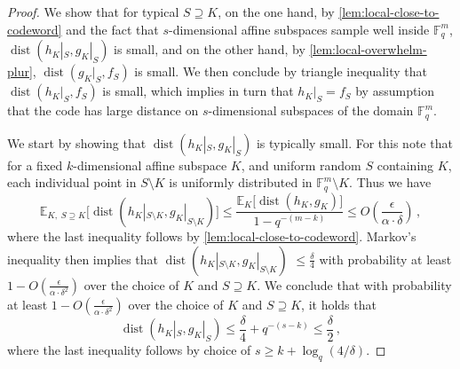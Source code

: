 \documentclass{toc}
\theoremstyle{plain}
\DeclareMathOperator{\dist}{dist} %
\newcommand{\E}{{\mathbb{E}}}
\newcommand{\F}{{\mathbb{F}}}
\begin{document}
\begin{proof}
  We show that for typical $S \supseteq K$, on the one hand, by \cref{lem:local-close-to-codeword} and the fact that $s$-dimensional affine subspaces sample well inside $\F_q^m$, $\dist(h_K|_S, g_K|_S)$ is small, and on the other hand, by \cref{lem:local-overwhelm-plur}, $\dist(g_K|_S, f_S)$ is small. We then conclude by triangle inequality that $\dist(h_K|_S, f_S)$ is  small, which implies in turn that $h_K|_S = f_S$ by assumption that the code
has large distance  %
on $s$-dimensional subspaces
of the domain $\F_q^m$.   %
%

We start by showing that $\dist(h_K|_S, g_K|_S)$ is typically small.
For this note that for a fixed $k$-dimensional affine subspace $K$, and uniform random $S$ containing $K$, each individual point in $S \setminus K$ is uniformly distributed in $\F_q^m\setminus K$. Thus we have
\[
 \E_{K,\;S \supseteq K}\big[\dist(h_{K}|_{S\setminus K},g_{K}|_{S \setminus K})\big] \leq \frac{\mathbb{E}_{K}\big[\dist(h_K,g_K)\big] } {1- q^{-(m-k)}}\leq O\left(\frac{\epsilon} {\alpha \cdot \delta}\right)\,,
\]
 where the last inequality follows by \cref{lem:local-close-to-codeword}. Markov's inequality then implies that 
 $\dist(h_{K}|_{S\setminus K},g_{K}|_{S \setminus K})$
%
$ \leq \frac{\delta} {4}$ with probability at least $1- O\left(\frac{\epsilon} {\alpha \cdot \delta^2}\right)$ over the choice of  $K$ and $S \supseteq K$. We conclude that with probability at least $1- O\left(\frac{\epsilon} {\alpha \cdot \delta^2}\right)$ over the choice of  $K$ and $S \supseteq K$, it holds that
  \begin{equation}\label{eq:g-h-close-on-T}
 \dist(h_K|_S, g_K|_S) \leq \frac{\delta} {4} + q^{-(s-k)}\leq \frac{\delta} {2}\, ,
  \end{equation}
 where the last inequality follows by choice of $s \geq k + \log_q(4/\delta)$.


\end{proof}
\end{document}
